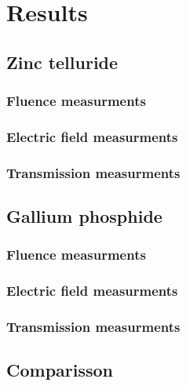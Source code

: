 \chapter{Results}
\section{Zinc telluride}
\subsection{Fluence measurments}
\subsection{Electric field measurments}
\subsection{Transmission measurments}
\section{Gallium phosphide}
\subsection{Fluence measurments}
\subsection{Electric field measurments}
\subsection{Transmission measurments}
\section{Comparisson}